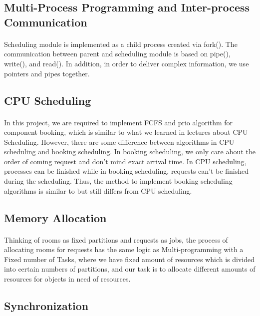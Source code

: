 \documentclass{article}
\begin{document}
        \subsection{Multi-Process Programming and Inter-process Communication}
            \paragraph{}
            Scheduling module is implemented as a child process created via fork(). The communication between parent and scheduling module is based on pipe(), write(), and read(). In addition, in order to deliver complex information, we use pointers and pipes together.
        \subsection{ CPU Scheduling}
            \paragraph{}
            In this project, we are required to implement FCFS and prio algorithm for component booking, which is similar to what we learned in lectures about CPU Scheduling. However, there are some difference between algorithms in CPU scheduling and booking scheduling. In booking scheduling, we only care about the order of coming request and don't mind exact arrival time. In CPU scheduling, processes can be finished while in booking scheduling, requests can't be finished during the scheduling. Thus, the method to implement booking scheduling algorithms is similar to but still differs from CPU scheduling.
        \subsection{Memory Allocation}
            \paragraph{}
            Thinking of rooms as fixed partitions and requests as jobs, the process of allocating rooms for requests has the same logic as Multi-programming with a Fixed number of Tasks, where we have fixed amount of resources which is divided into certain numbers of partitions, and our task is to allocate different amounts of resources for objects in need of resources.
        \subsection{Synchronization}
\end{document}
